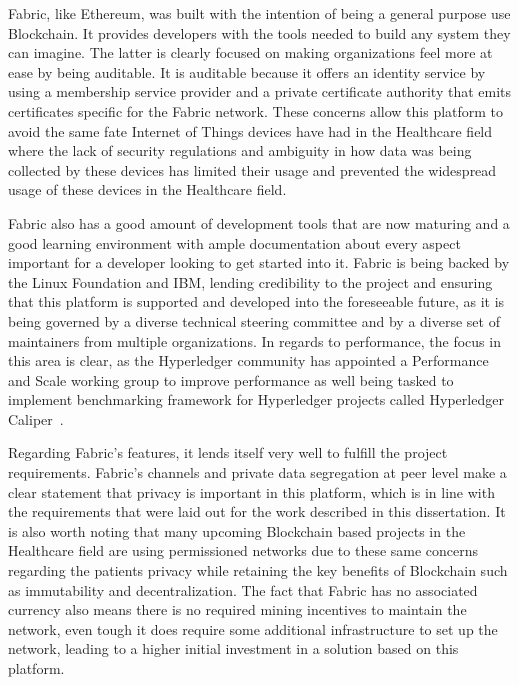 Fabric, like Ethereum, was built with the intention of being a general purpose
use Blockchain. It provides developers with the tools needed to build any
system they can imagine. The latter is clearly focused on making organizations
feel more at ease by being auditable. It is auditable because it offers an
identity service by using a membership service provider and a private
certificate authority that emits certificates specific for the Fabric network.
These concerns allow this platform to avoid the same fate Internet of Things
devices have had in the Healthcare field~\cite{Tana2017} where the lack of
security regulations and ambiguity in how data was being collected by these
devices has limited their usage and prevented the widespread usage of these
devices in the Healthcare field.

Fabric also has a good amount of development tools that are now maturing and a
good learning environment with ample documentation about every aspect important
for a developer looking to get started into it. Fabric is being backed by the
Linux Foundation and IBM, lending credibility to the project and ensuring that
this platform is supported and developed into the foreseeable future, as it is
being governed by a diverse technical steering committee and by a diverse set
of maintainers from multiple organizations. In regards to performance, the
focus in this area is clear, as the Hyperledger community has appointed a
Performance and Scale working group to improve performance as well being tasked
to implement benchmarking framework for Hyperledger projects called Hyperledger
Caliper~\cite{performanceScale2017}.

Regarding Fabric's features, it lends itself very well to fulfill the project
requirements. Fabric's channels and private data segregation at peer level make
a clear statement that privacy is important in this platform, which is in line
with the requirements that were laid out for the work described in this
dissertation. It is also worth noting that many upcoming Blockchain based
projects in the Healthcare field are using permissioned networks due to these
same concerns regarding the patients privacy while retaining the key benefits
of Blockchain such as immutability and decentralization. The fact that Fabric
has no associated currency also means there is no required mining incentives to
maintain the network, even tough it does require some additional infrastructure
to set up the network, leading to a higher initial investment in a solution
based on this platform.

